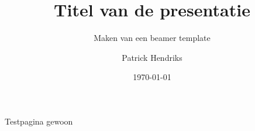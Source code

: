 \documentclass[aspectratio=43]{beamer}
\title{Titel van de presentatie}
\subtitle{Maken van een beamer template}
\date{\today}
\author[Patrick Hendriks]{Patrick Hendriks}
\begin{document}
\begin{frame}[plain]
\titlepage
\end{frame}

\begin{frame}

\end{frame}

\begin{frame}{Testpagina gewoon}
\end{frame}
\end{document}
